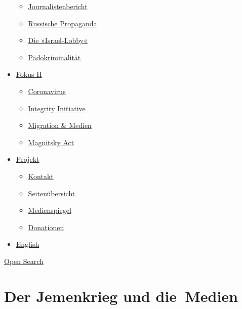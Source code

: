 \begin{itemize}
  \begin{itemize}
  \tightlist
  \item
    \href{https://swprs.org/bericht-eines-journalisten/}{Journalistenbericht}
  \item
    \href{https://swprs.org/russische-propaganda/}{Russische Propaganda}
  \item
    \href{https://swprs.org/die-israel-lobby-fakten-und-mythen/}{Die
    »Israel-Lobby«}
  \item
    \href{https://swprs.org/geopolitik-und-paedokriminalitaet/}{Pädokriminalität}
  \end{itemize}
\item
  \href{https://swprs.org/migration-und-medien/}{Fokus II}

  \begin{itemize}
  \tightlist
  \item
    \href{https://swprs.org/covid-19-hinweis-ii/}{Coronavirus}
  \item
    \href{https://swprs.org/die-integrity-initiative/}{Integrity
    Initiative}
  \item
    \href{https://swprs.org/migration-und-medien/}{Migration \& Medien}
  \item
    \href{https://swprs.org/der-fall-magnitsky/}{Magnitsky Act}
  \end{itemize}
\item
  \href{https://swprs.org/kontakt/}{Projekt}

  \begin{itemize}
  \tightlist
  \item
    \href{https://swprs.org/kontakt/}{Kontakt}
  \item
    \href{https://swprs.org/uebersicht/}{Seitenübersicht}
  \item
    \href{https://swprs.org/medienspiegel/}{Medienspiegel}
  \item
    \href{https://swprs.org/donationen/}{Donationen}
  \end{itemize}
\item
  \href{https://swprs.org/contact/}{English}
\end{itemize}

\protect\hyperlink{}{Open Search}

\hypertarget{der-jemenkrieg-und-die-medien}{%
\section{Der Jemenkrieg und
die~Medien}\label{der-jemenkrieg-und-die-medien}}

